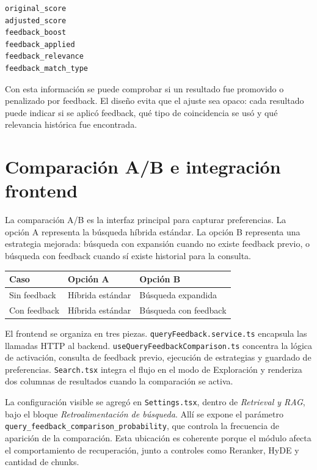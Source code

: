 \documentclass[12pt,a4paper]{article}
\begin{document}
\begin{lstlisting}
original_score
adjusted_score
feedback_boost
feedback_applied
feedback_relevance
feedback_match_type
\end{lstlisting}

Con esta información se puede comprobar si un resultado fue promovido o penalizado por feedback. El diseño evita que el ajuste sea opaco: cada resultado puede indicar si se aplicó feedback, qué tipo de coincidencia se usó y qué relevancia histórica fue encontrada.

\section{Comparación A/B e integración frontend}

La comparación A/B es la interfaz principal para capturar preferencias. La opción A representa la búsqueda híbrida estándar. La opción B representa una estrategia mejorada: búsqueda con expansión cuando no existe feedback previo, o búsqueda con feedback cuando sí existe historial para la consulta.

\begin{center}
\begin{tabular}{lll}
\toprule
\textbf{Caso} & \textbf{Opción A} & \textbf{Opción B} \\
\midrule
Sin feedback & Híbrida estándar & Búsqueda expandida \\
Con feedback & Híbrida estándar & Búsqueda con feedback \\
\bottomrule
\end{tabular}
\end{center}

El frontend se organiza en tres piezas. \texttt{queryFeedback.service.ts} encapsula las llamadas HTTP al backend. \texttt{useQueryFeedbackComparison.ts} concentra la lógica de activación, consulta de feedback previo, ejecución de estrategias y guardado de preferencias. \texttt{Search.tsx} integra el flujo en el modo de Exploración y renderiza dos columnas de resultados cuando la comparación se activa.

La configuración visible se agregó en \texttt{Settings.tsx}, dentro de \textit{Retrieval y RAG}, bajo el bloque \textit{Retroalimentación de búsqueda}. Allí se expone el parámetro \texttt{query\_feedback\_comparison\_probability}, que controla la frecuencia de aparición de la comparación. Esta ubicación es coherente porque el módulo afecta el comportamiento de recuperación, junto a controles como Reranker, HyDE y cantidad de chunks.
\end{document}
